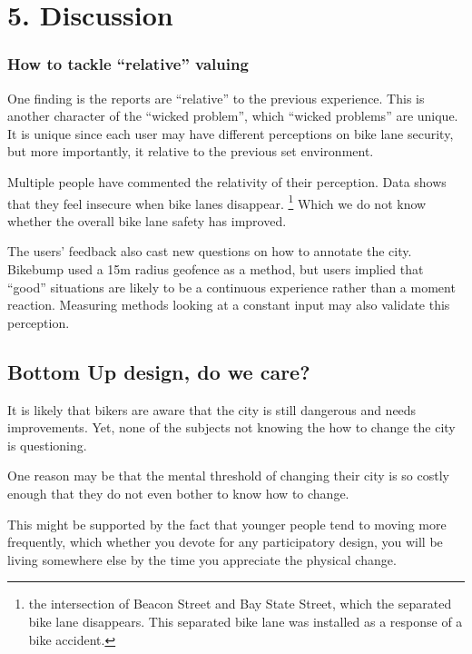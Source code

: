 \chapter{5. Discussion}

\subsection{How to tackle ``relative'' valuing}
One finding is the reports are ``relative'' to the previous
experience. This is another character of the ``wicked problem'', which
``wicked problems'' are unique.\cite{rittel2973dilemmas} 
It is unique since each user may have different perceptions on bike
lane security, but more importantly, it relative to the previous set
environment.

Multiple people have commented the relativity of their perception. Data
shows that they feel insecure when bike lanes disappear.
\footnote{the intersection of Beacon Street and Bay State Street, which the
separated bike lane disappears. This separated bike lane was installed as a
response of a bike accident.}
Which we do not know whether the overall bike lane safety has improved.

The users' feedback also cast new questions on how to annotate the
city. Bikebump used a 15m radius geofence as a method, but users implied
that ``good'' situations are likely to be a continuous experience rather than
a moment reaction. Measuring methods looking at a constant input may also
validate this perception.

\section{Bottom Up design, do we care?}

It is likely that bikers are aware that the city is still dangerous and
needs improvements. Yet, none of the subjects not knowing the 
how to change the city is questioning.

One reason may be that the mental threshold of changing their city is so
costly enough that they do not even bother to know how to change.

This might be supported by the fact that younger people tend to moving more
frequently,%
which whether you devote for any participatory design, you will
be living somewhere else by the time you appreciate the physical change.

